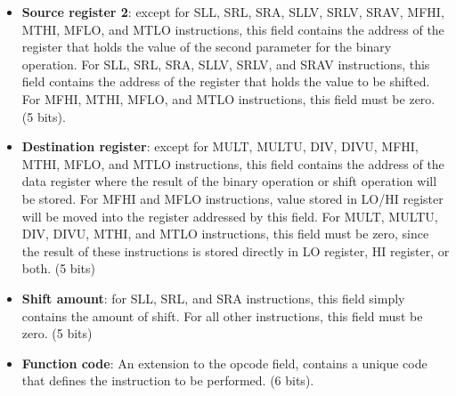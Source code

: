 \documentclass[]{scrartcl}
\begin{document}
\begin{itemize}
\begin{itemize}
\item \textbf{Source register 2}: except for SLL, SRL, SRA, SLLV, SRLV,
                                  SRAV, MFHI, MTHI, MFLO, and MTLO
                                  instructions, this field contains
                                  the address of the register that
                                  holds the value of the second parameter
                                  for the binary operation.
                                  For SLL, SRL, SRA, SLLV, SRLV, and
                                  SRAV instructions, this field contains
                                  the address of the register that
                                  holds the value to be shifted.
                                  For MFHI, MTHI, MFLO, and MTLO instructions,
                                  this field must be zero. (5 bits).

\item \textbf{Destination register}: except for MULT, MULTU, DIV, DIVU,
                                     MFHI, MTHI, MFLO, and MTLO instructions,
                                     this field contains the address of the
                                     data register where the result of the
                                     binary operation or shift operation will
                                     be stored.
                                     For MFHI and MFLO instructions, value
                                     stored in LO/HI register will be moved
                                     into the register addressed by this field.
                                     For MULT, MULTU, DIV, DIVU, MTHI, and MTLO
                                     instructions, this field must be zero,
                                     since the result of these instructions
                                     is stored directly in LO register, HI
                                     register, or both. (5 bits)

\item \textbf{Shift amount}: for SLL, SRL, and SRA instructions, this field
                             simply contains the amount of shift. For all
                             other instructions, this field must be zero.
                             (5 bits)

\item \textbf{Function code}: An extension to the opcode field, contains
                              a unique code that defines the instruction
                              to be performed. (6 bits).
\end{itemize}


\end{itemize}
\end{document}
